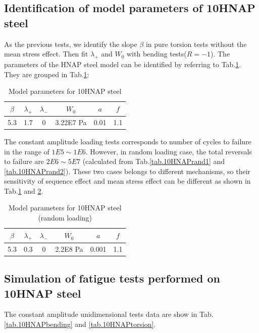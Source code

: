 \documentclass[3p,times,procedia,number]{elsarticle}
\begin{document}
\subsection{Identification of model parameters of 10HNAP steel}
As the previous tests, we identify the slope $\beta$ in pure torsion tests without the mean stress effect. Then fit $\lambda_+$ and $W_0$ with bending tests($R=-1$). The parameters of the HNAP steel model can be identified by referring to Tab.\ref{tab.10HNAP.para}. They are grouped in Tab.\ref{tab.10HNAP.para}:
\begin{table}[!h]
	\centering
	\begin{tabular}{|c|c|c|c|c|c|}
		\hline
		\textbf{$\beta$} & \textbf{$\lambda_+$} & \textbf{$\lambda_-$} & \textbf{$W_0$} & \textbf{$a$} & \textbf{$f$} \\ \hline
		5.3    & 1.7 &0         &3.22E7 Pa  & 0.01   & 1.1 \\ \hline
	\end{tabular}
	\caption{Model parameters for 10HNAP steel}
	\label{tab.10HNAP.para}
\end{table}

The constant amplitude loading tests corresponds to number of cycles to failure in the range of $1E5\sim1E6$. However, in random loading case, the total reversals to failure are $2E6\sim5E7$ (calculated from Tab.\ref{tab.10HNAPrand1} and \ref{tab.10HNAPrand2}). These two cases belongs to different mechanisms, so their sensitivity of sequence effect and mean stress effect can be different as shown in Tab.\ref{tab.10HNAP.para} and \ref{tab.10HNAP.para.random}.

\begin{table}[!h]
	\centering
	\begin{tabular}{|c|c|c|c|c|c|}
		\hline
		\textbf{$\beta$} & \textbf{$\lambda_+$} & \textbf{$\lambda_-$} & \textbf{$W_0$} & \textbf{$a$} & \textbf{$f$} \\ \hline
		5.3    & 0.3 &0         &2.2E8 Pa  & 0.001   & 1.1 \\ \hline
	\end{tabular}
	\caption{Model parameters for 10HNAP steel (random loading)}
	\label{tab.10HNAP.para.random}
\end{table}

\newpage
\subsection{Simulation of fatigue tests performed on 10HNAP steel}
The constant amplitude unidimensional tests data are show in Tab.\ref{tab.10HNAPbending} and \ref{tab.10HNAPtorsion}.
\end{document}
